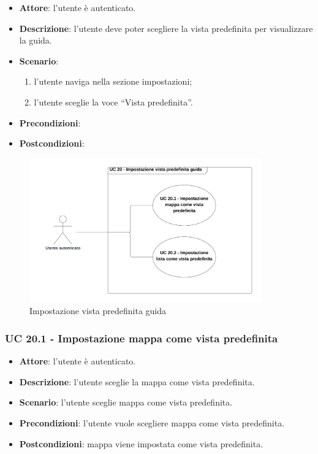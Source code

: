 \begin{itemize}
    \item \textbf{Attore}: l'utente è autenticato.
    \item \textbf{Descrizione}: l'utente deve poter scegliere la vista predefinita per visualizzare la guida.
    \item \textbf{Scenario}:
    \begin{enumerate}
        \item l'utente naviga nella sezione impostazioni;
        \item l'utente sceglie la voce “Vista predefinita”.
    \end{enumerate}

    \item \textbf{Precondizioni}: %
    \item \textbf{Postcondizioni}: %
\end{itemize}

\begin{figure}[!h]
    \includegraphics[width=10cm]{sezioni/Images/UC20_s.png}
    \centering
    \caption{Impostazione vista predefinita guida}
\end{figure}

\subsubsection{UC 20.1 - Impostazione mappa come vista predefinita}
\begin{itemize}
    \item \textbf{Attore}: l'utente è autenticato.
    \item \textbf{Descrizione}: l'utente sceglie la mappa come vista predefinita.
    \item \textbf{Scenario}: l'utente sceglie mappa come vista predefinita.
    \item \textbf{Precondizioni}: l'utente vuole scegliere mappa come vista predefinita.
    \item \textbf{Postcondizioni}: mappa viene impostata come vista predefinita.

\end{itemize}

